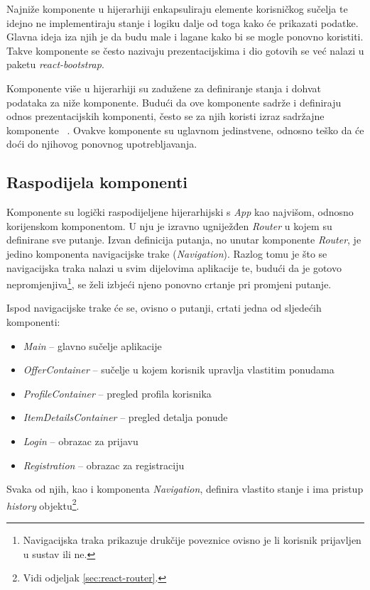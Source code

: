 \documentclass[times, utf8, zavrsni, numeric]{fer}
\newcommand{\razmaks}{\vspace{10pt}}
\begin{document}
Najniže komponente u hijerarhiji enkapsuliraju elemente korisničkog sučelja te idejno ne implementiraju stanje i logiku dalje od toga kako će prikazati podatke.
Glavna ideja iza njih je da budu male i lagane kako bi se mogle ponovno koristiti.
Takve komponente se često nazivaju prezentacijskima i dio gotovih se već nalazi u paketu \emph{react-bootstrap}.

Komponente više u hijerarhiji su zadužene za definiranje stanja i dohvat podataka za niže komponente.
Budući da ove komponente sadrže i definiraju odnos prezentacijskih komponenti, često se za njih koristi izraz \glqq sadržajne komponente\grqq ~ .\citep{componentTypes}
Ovakve komponente su uglavnom jedinstvene, odnosno teško da će doći do njihovog ponovnog upotrebljavanja.

\newpage

\subsection{Raspodijela komponenti}

Komponente su logički raspodijeljene hijerarhijski s \emph{App} kao najvišom, odnosno korijenskom komponentom.
U nju je izravno ugniježđen \emph{Router} u kojem su definirane sve putanje.
Izvan definicija putanja, no unutar komponente \emph{Router}, je jedino komponenta navigacijske trake (\emph{Navigation}).
Razlog tomu je što se navigacijska traka nalazi u svim dijelovima aplikacije te, budući da je gotovo nepromjenjiva\footnote{Navigacijska traka prikazuje drukčije poveznice ovisno je li korisnik prijavljen u sustav ili ne.}, se želi izbjeći njeno ponovno crtanje pri promjeni putanje.

Ispod navigacijske trake će se, ovisno o putanji, crtati jedna od sljedećih komponenti:
\begin{itemize}
  \item \emph{Main} -- glavno sučelje aplikacije
  \item \emph{OfferContainer} -- sučelje u kojem korisnik upravlja vlastitim ponudama
  \item \emph{ProfileContainer} -- pregled profila korisnika
  \item \emph{ItemDetailsContainer} -- pregled detalja ponude
  \item \emph{Login} -- obrazac za prijavu
  \item \emph{Registration} -- obrazac za registraciju
\end{itemize}
\razmaks
Svaka od njih, kao i komponenta \emph{Navigation}, definira vlastito stanje i ima pristup \emph{history} objektu\footnote{Vidi odjeljak \ref{sec:react-router}.}.
\end{document}
